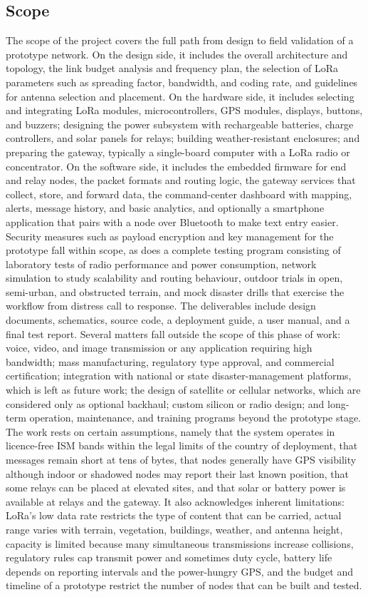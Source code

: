 \subsection{Scope}
The scope of the project covers the full path from design to field validation of a prototype network. On the design side, it includes the overall architecture and topology, the link budget analysis and frequency plan, the selection of LoRa parameters such as spreading factor, bandwidth, and coding rate, and guidelines for antenna selection and placement. On the hardware side, it includes selecting and integrating LoRa modules, microcontrollers, GPS modules, displays, buttons, and buzzers; designing the power subsystem with rechargeable batteries, charge controllers, and solar panels for relays; building weather-resistant enclosures; and preparing the gateway, typically a single-board computer with a LoRa radio or concentrator. On the software side, it includes the embedded firmware for end and relay nodes, the packet formats and routing logic, the gateway services that collect, store, and forward data, the command-center dashboard with mapping, alerts, message history, and basic analytics, and optionally a smartphone application that pairs with a node over Bluetooth to make text entry easier. Security measures such as payload encryption and key management for the prototype fall within scope, as does a complete testing program consisting of laboratory tests of radio performance and power consumption, network simulation to study scalability and routing behaviour, outdoor trials in open, semi-urban, and obstructed terrain, and mock disaster drills that exercise the workflow from distress call to response. The deliverables include design documents, schematics, source code, a deployment guide, a user manual, and a final test report. Several matters fall outside the scope of this phase of work: voice, video, and image transmission or any application requiring high bandwidth; mass manufacturing, regulatory type approval, and commercial certification; integration with national or state disaster-management platforms, which is left as future work; the design of satellite or cellular networks, which are considered only as optional backhaul; custom silicon or radio design; and long-term operation, maintenance, and training programs beyond the prototype stage. The work rests on certain assumptions, namely that the system operates in licence-free ISM bands within the legal limits of the country of deployment, that messages remain short at tens of bytes, that nodes generally have GPS visibility although indoor or shadowed nodes may report their last known position, that some relays can be placed at elevated sites, and that solar or battery power is available at relays and the gateway. It also acknowledges inherent limitations: LoRa’s low data rate restricts the type of content that can be carried, actual range varies with terrain, vegetation, buildings, weather, and antenna height, capacity is limited because many simultaneous transmissions increase collisions, regulatory rules cap transmit power and sometimes duty cycle, battery life depends on reporting intervals and the power-hungry GPS, and the budget and timeline of a prototype restrict the number of nodes that can be built and tested.

